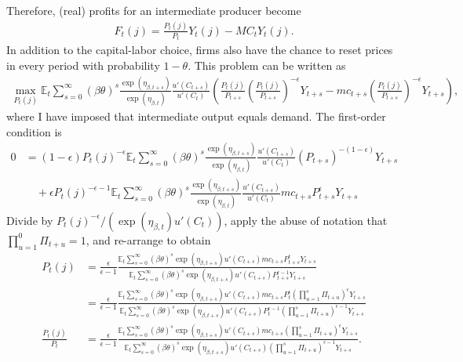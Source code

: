 \documentclass[12 pt, oneside]{article}
\theoremstyle{definition}
\theoremstyle{definition}
\theoremstyle{definition}
\newcommand{\E}{\mathbb{E}}
\begin{document}
Therefore, (real) profits for an intermediate producer become
\begin{align*}
  F_t(j) = \frac{P_t(j)}{P_t}Y_t(j) - MC_t Y_t(j).
\end{align*}
In addition to the capital-labor choice, firms also have the chance to reset prices in every period with probability $1 - \theta$. This problem can be
written as
\begin{align*}
  \max_{P_t(j)} \E_t\sum_{s = 0}^\infty(\beta \theta)^s\frac{\exp(\eta_{\beta, t + s})}{\exp(\eta_{\beta, t})}\frac{u'(C_{t + s})}{u'(C_t)}\left(\frac{P_t(j)}{P_{t + s}}\left(\frac{P_t(j)}{P_{t + s}}\right)^{-\epsilon}Y_{t + s} - mc_{t + s}\left(\frac{P_t(j)}{P_{t + s}}\right)^{-\epsilon}Y_{t + s}\right),
\end{align*}
where I have imposed that intermediate output equals demand. The first-order condition is
\begin{align*}
0 & =  (1 - \epsilon)P_t(j)^{-\epsilon}\E_t\sum_{s = 0}^\infty (\beta\theta)^s \frac{\exp(\eta_{\beta, t + s})}{\exp(\eta_{\beta, t})}\frac{u'(C_{t + s})}{u'(C_t)}(P_{t + s})^{-(1 - \epsilon)}Y_{t + s}\\
  &\quad + \epsilon P_t(j)^{-\epsilon - 1}\E_t\sum_{s = 0}^\infty (\beta\theta)^s \frac{\exp(\eta_{\beta, t + s})}{\exp(\eta_{\beta, t})}\frac{u'(C_{t + s})}{u'(C_t)} mc_{t + s}P_{t + s}^{\epsilon}Y_{t + s}
\end{align*}
Divide by $P_t(j)^{-\epsilon} / (\exp(\eta_{\beta, t})u'(C_t))$, apply the abuse of notation that $\prod_{u = 1}^0 \Pi_{t + u} = 1$, and re-arrange to obtain
\begin{align*}
  P_t(j) & = \frac{\epsilon}{\epsilon - 1}\frac{\E_t\sum_{s = 0}^\infty (\beta\theta)^s \exp(\eta_{\beta, t + s})u'(C_{t + s}) mc_{t + s}P_{t + s}^{\epsilon}Y_{t + s}}{\E_t\sum_{s = 0}^\infty (\beta\theta)^s \exp(\eta_{\beta, t + s})u'(C_{t + s})P_{t + s}^{\epsilon - 1}Y_{t + s}}\\
         & = \frac{\epsilon}{\epsilon - 1}\frac{\E_t\sum_{s = 0}^\infty (\beta\theta)^s \exp(\eta_{\beta, t + s})u'(C_{t + s}) mc_{t + s}P_t^\epsilon\left(\prod_{u = 1}^s\Pi_{t + u}\right)^{\epsilon}Y_{t + s}}{\E_t\sum_{s = 0}^\infty (\beta\theta)^s \exp(\eta_{\beta, t + s})u'(C_{t + s})P_t^{\epsilon - 1}\left(\prod_{u = 1}^s\Pi_{t + u}\right)^{\epsilon - 1}Y_{t + s}}\\
  \frac{P_t(j)}{P_t} & = \frac{\epsilon}{\epsilon - 1}\frac{\E_t\sum_{s = 0}^\infty (\beta\theta)^s \exp(\eta_{\beta, t + s})u'(C_{t + s}) mc_{t + s}\left(\prod_{u = 1}^s\Pi_{t + u}\right)^{\epsilon}Y_{t + s}}{\E_t\sum_{s = 0}^\infty (\beta\theta)^s \exp(\eta_{\beta, t + s})u'(C_{t + s})\left(\prod_{u = 1}^s\Pi_{t + u}\right)^{\epsilon - 1}Y_{t + s}}.
\end{align*}
\end{document}
